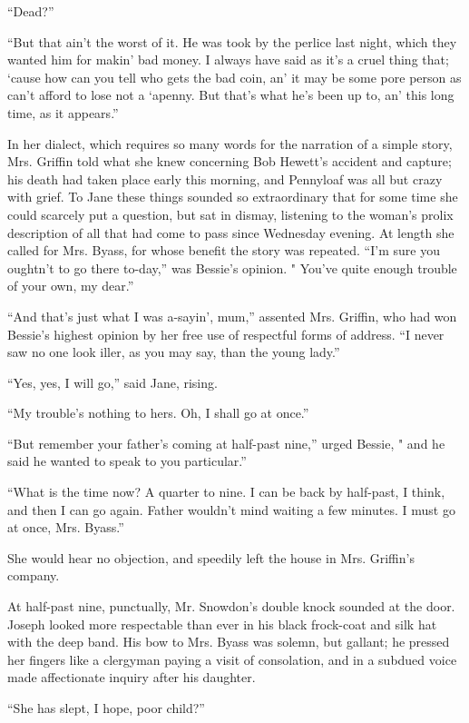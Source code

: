 ``Dead?''

``But that ain't the worst of it. He was took by the perlice last night,
which they wanted him for makin' bad money. I always have said as it's a
cruel thing that; `cause how can you tell who gets the bad coin, an' it
may be some pore person as can't afford to lose not a `apenny. But
that's what he's been up to, an' this long time, as it appears.''

In her dialect, which requires so many words for the narration of a
simple story, Mrs. Griffin {}told what she knew concerning Bob Hewett's
accident and capture; his death had taken place early this morning, and
Pennyloaf was all but crazy with grief. To Jane these things sounded so
extraordinary that for some time she could scarcely put a question, but
sat in dismay, listening to the woman's prolix description of all that
had come to pass since Wednesday evening. At length she called for Mrs.
Byass, for whose benefit the story was repeated. ``I'm sure you oughtn't
to go there to-day,'' was Bessie's opinion. " You've quite enough
trouble of your own, my dear.''

``And that's just what I was a-sayin', mum,'' assented Mrs. Griffin, who
had won Bessie's highest opinion by her free use of respectful forms of
address. ``I never saw no one look iller, as you may say, than the young
lady.''

``Yes, yes, I will go,'' said Jane, rising.

``My trouble's nothing to hers. Oh, I shall go at once.''

``But remember your father's coming at half-past nine,'' urged Bessie, "
and he said he wanted to speak to you particular.''

``What is the time now? A quarter to {}nine. I can be back by half-past,
I think, and then I can go again. Father wouldn't mind waiting a few
minutes. I must go at once, Mrs. Byass.''

She would hear no objection, and speedily left the house in Mrs.
Griffin's company.

At half-past nine, punctually, Mr. Snowdon's double knock sounded at the
door. Joseph looked more respectable than ever in his black frock-coat
and silk hat with the deep band. His bow to Mrs. Byass was solemn, but
gallant; he pressed her fingers like a clergyman paying a visit of
consolation, and in a subdued voice made affectionate inquiry after his
daughter.

``She has slept, I hope, poor child?''

